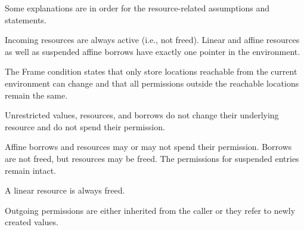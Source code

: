 \SoundnessThm

Some explanations are in order for the resource-related assumptions
and statements.

Incoming resources are always active (i.e., not freed).
Linear and affine resources as well as suspended affine borrows have
exactly one pointer in the environment.

The Frame condition states that only store locations reachable from
the current environment can change and that all permissions outside
the reachable locations remain the same.

Unrestricted values, resources, and borrows do not change their
underlying resource and do not spend their permission.

Affine borrows and resources may or may not spend their
permission. Borrows are not freed, but resources may be freed. The
permissions for suspended entries remain intact.


A linear resource is always freed.

Outgoing permissions are either inherited from the caller or they
refer to newly created values.



